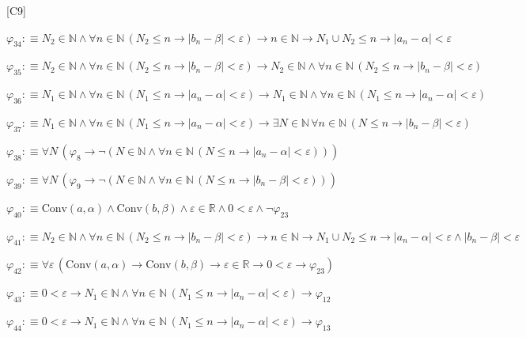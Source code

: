 \begin{fullproof}{[C9]}
\begin{abbrevlist}
\item $\varphi_{34} :\equiv N_{2} \in \mathbb{N} \land \forall n \in \mathbb{N}\,(N_{2} \leq n \to \lvert b_{n} - \beta \rvert < \varepsilon) \to n \in \mathbb{N} \to N_{1} \cup N_{2} \leq n \to \lvert a_{n} - \alpha \rvert < \varepsilon$
\item $\varphi_{35} :\equiv N_{2} \in \mathbb{N} \land \forall n \in \mathbb{N}\,(N_{2} \leq n \to \lvert b_{n} - \beta \rvert < \varepsilon) \to N_{2} \in \mathbb{N} \land \forall n \in \mathbb{N}\,(N_{2} \leq n \to \lvert b_{n} - \beta \rvert < \varepsilon)$
\item $\varphi_{36} :\equiv N_{1} \in \mathbb{N} \land \forall n \in \mathbb{N}\,(N_{1} \leq n \to \lvert a_{n} - \alpha \rvert < \varepsilon) \to N_{1} \in \mathbb{N} \land \forall n \in \mathbb{N}\,(N_{1} \leq n \to \lvert a_{n} - \alpha \rvert < \varepsilon)$
\item $\varphi_{37} :\equiv N_{1} \in \mathbb{N} \land \forall n \in \mathbb{N}\,(N_{1} \leq n \to \lvert a_{n} - \alpha \rvert < \varepsilon) \to \exists N \in \mathbb{N}\,\forall n \in \mathbb{N}\,(N \leq n \to \lvert b_{n} - \beta \rvert < \varepsilon)$
\item $\varphi_{38} :\equiv \forall N\,(\varphi_{8} \to \neg (N \in \mathbb{N} \land \forall n \in \mathbb{N}\,(N \leq n \to \lvert a_{n} - \alpha \rvert < \varepsilon)))$
\item $\varphi_{39} :\equiv \forall N\,(\varphi_{9} \to \neg (N \in \mathbb{N} \land \forall n \in \mathbb{N}\,(N \leq n \to \lvert b_{n} - \beta \rvert < \varepsilon)))$
\item $\varphi_{40} :\equiv \mathrm{Conv}(a,\alpha) \land \mathrm{Conv}(b,\beta) \land \varepsilon \in \mathbb{R} \land 0 < \varepsilon \land \neg \varphi_{23}$
\item $\varphi_{41} :\equiv N_{2} \in \mathbb{N} \land \forall n \in \mathbb{N}\,(N_{2} \leq n \to \lvert b_{n} - \beta \rvert < \varepsilon) \to n \in \mathbb{N} \to N_{1} \cup N_{2} \leq n \to \lvert a_{n} - \alpha \rvert < \varepsilon \land \lvert b_{n} - \beta \rvert < \varepsilon$
\item $\varphi_{42} :\equiv \forall \varepsilon\,(\mathrm{Conv}(a,\alpha) \to \mathrm{Conv}(b,\beta) \to \varepsilon \in \mathbb{R} \to 0 < \varepsilon \to \varphi_{23})$
\item $\varphi_{43} :\equiv 0 < \varepsilon \to N_{1} \in \mathbb{N} \land \forall n \in \mathbb{N}\,(N_{1} \leq n \to \lvert a_{n} - \alpha \rvert < \varepsilon) \to \varphi_{12}$
\item $\varphi_{44} :\equiv 0 < \varepsilon \to N_{1} \in \mathbb{N} \land \forall n \in \mathbb{N}\,(N_{1} \leq n \to \lvert a_{n} - \alpha \rvert < \varepsilon) \to \varphi_{13}$

\end{abbrevlist}
\end{fullproof}
